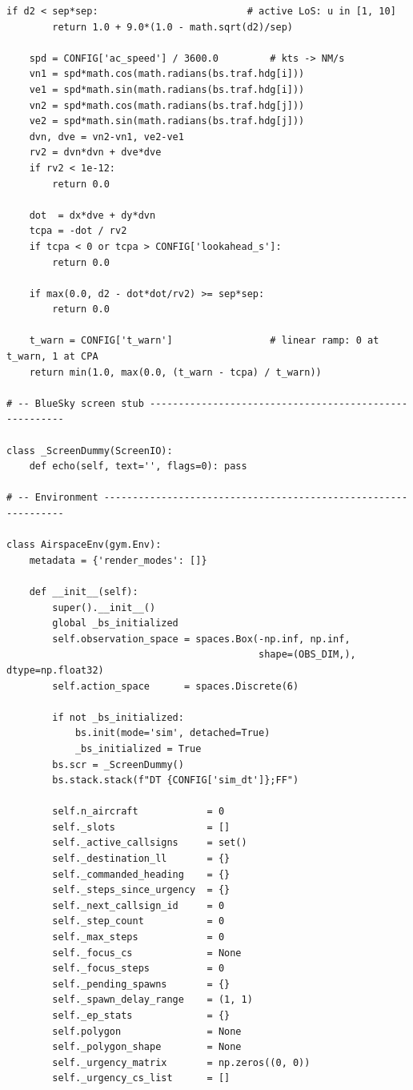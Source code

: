 \documentclass[10pt, a4paper]{article}
\begin{document}
\begin{lstlisting}[caption={v3\_simple\_env.py --- ATCO conflict-resolution environment}, label=lst:env]
    if d2 < sep*sep:                          # active LoS: u in [1, 10]
        return 1.0 + 9.0*(1.0 - math.sqrt(d2)/sep)

    spd = CONFIG['ac_speed'] / 3600.0         # kts -> NM/s
    vn1 = spd*math.cos(math.radians(bs.traf.hdg[i]))
    ve1 = spd*math.sin(math.radians(bs.traf.hdg[i]))
    vn2 = spd*math.cos(math.radians(bs.traf.hdg[j]))
    ve2 = spd*math.sin(math.radians(bs.traf.hdg[j]))
    dvn, dve = vn2-vn1, ve2-ve1
    rv2 = dvn*dvn + dve*dve
    if rv2 < 1e-12:
        return 0.0

    dot  = dx*dve + dy*dvn
    tcpa = -dot / rv2
    if tcpa < 0 or tcpa > CONFIG['lookahead_s']:
        return 0.0

    if max(0.0, d2 - dot*dot/rv2) >= sep*sep:
        return 0.0

    t_warn = CONFIG['t_warn']                 # linear ramp: 0 at t_warn, 1 at CPA
    return min(1.0, max(0.0, (t_warn - tcpa) / t_warn))

# -- BlueSky screen stub -------------------------------------------------------

class _ScreenDummy(ScreenIO):
    def echo(self, text='', flags=0): pass

# -- Environment ---------------------------------------------------------------

class AirspaceEnv(gym.Env):
    metadata = {'render_modes': []}

    def __init__(self):
        super().__init__()
        global _bs_initialized
        self.observation_space = spaces.Box(-np.inf, np.inf,
                                            shape=(OBS_DIM,), dtype=np.float32)
        self.action_space      = spaces.Discrete(6)

        if not _bs_initialized:
            bs.init(mode='sim', detached=True)
            _bs_initialized = True
        bs.scr = _ScreenDummy()
        bs.stack.stack(f"DT {CONFIG['sim_dt']};FF")

        self.n_aircraft            = 0
        self._slots                = []
        self._active_callsigns     = set()
        self._destination_ll       = {}
        self._commanded_heading    = {}
        self._steps_since_urgency  = {}
        self._next_callsign_id     = 0
        self._step_count           = 0
        self._max_steps            = 0
        self._focus_cs             = None
        self._focus_steps          = 0
        self._pending_spawns       = {}
        self._spawn_delay_range    = (1, 1)
        self._ep_stats             = {}
        self.polygon               = None
        self._polygon_shape        = None
        self._urgency_matrix       = np.zeros((0, 0))
        self._urgency_cs_list      = []


\end{lstlisting}
\end{document}
